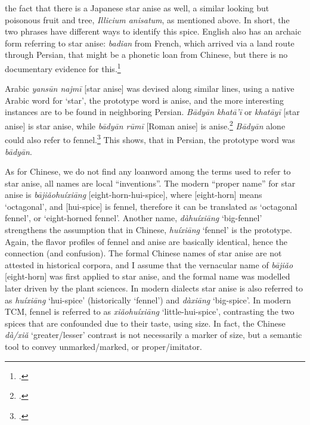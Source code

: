 the fact that there is a Japanese star anise as well, a similar looking but poisonous fruit and tree, \textit{Illicium anisatum}, as mentioned above. In short, the two phrases have different ways to identify this spice. English also has an archaic form referring to star anise: \textit{badian} from French, which arrived via a land route through Persian, that might be a phonetic loan from Chinese, but there is no documentary evidence for this.\footcite[badian]{oed}

Arabic \textit{yansūn najmī} [star anise] was devised along similar lines, using a native Arabic word for `star', the prototype word is anise, and the more interesting instances are to be found in neighboring Persian. \textit{Bādyān khatā'ī} or \textit{khatāyī} [star anise] is star anise, while \textit{bādyān rūmī} [Roman anise] is anise.\footcite[Vol. 1, p. 197]{hayyim_new_1934} \textit{Bādyān} alone could also refer to fennel.\footcite[140]{steingass_comprehensive_1892} This shows, that in Persian, the prototype word was \textit{bādyān}. 

As for Chinese, we do not find any loanword among the terms used to refer to star anise, all names are local ``inventions''. The modern ``proper name'' for star anise is \textit{bājiǎohuíxiāng} [eight-horn-hui-spice], where [eight-horn] means `octagonal', and [hui-spice] is fennel, therefore it can be translated as `octagonal fennel', or `eight-horned fennel'. Another name, \textit{dàhuíxiāng} `big-fennel' strengthens the assumption that in Chinese, \textit{huíxiāng} `fennel' is the prototype. Again, the flavor profiles of fennel and anise are basically identical, hence the connection (and confusion). The formal Chinese names of star anise are not attested in historical corpora, and I assume that the vernacular name of \textit{bājiǎo} [eight-horn] was first applied to star anise, and the formal name was modelled later driven by the plant sciences. In modern dialects star anise is also referred to as \textit{huíxiāng} `hui-spice' (historically `fennel') and \textit{dàxiāng} `big-spice'. In modern \gls{TCM}, fennel is referred to as \textit{xiǎohuíxiāng} `little-hui-spice', contrasting the two spices that are confounded due to their taste, using size. In fact, the Chinese  \textit{dà/xiǎ} `greater/lesser' contrast is not necessarily a marker of size, but a semantic tool to convey unmarked/marked, or proper/imitator.


